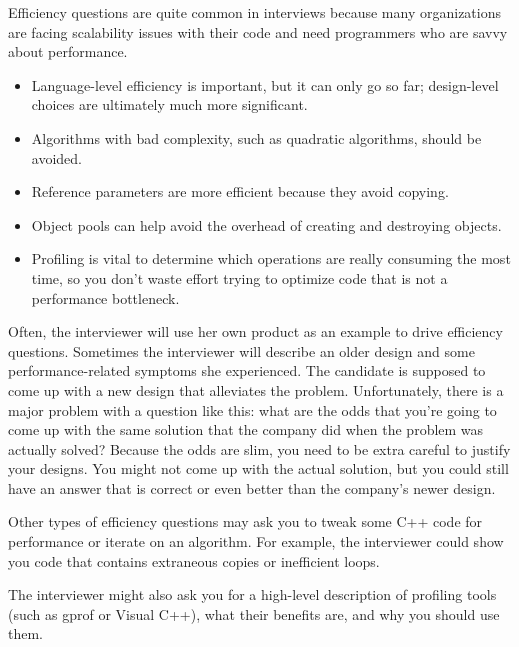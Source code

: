 
Efficiency questions are quite common in interviews because many organizations are facing scalability issues with their code and need programmers who are savvy about performance.


\begin{itemize}
\item
Language-level efficiency is important, but it can only go so far; design-level choices are ultimately much more significant.

\item
Algorithms with bad complexity, such as quadratic algorithms, should be avoided.

\item
Reference parameters are more efficient because they avoid copying.

\item
Object pools can help avoid the overhead of creating and destroying objects.

\item
Profiling is vital to determine which operations are really consuming the most time, so you don’t waste effort trying to optimize code that is not a performance bottleneck.
\end{itemize}


Often, the interviewer will use her own product as an example to drive efficiency questions. Sometimes the interviewer will describe an older design and some performance-related symptoms she experienced. The candidate is supposed to come up with a new design that alleviates the problem. Unfortunately, there is a major problem with a question like this: what are the odds that you’re going to come up with the same solution that the company did when the problem was actually solved? Because the odds are slim, you need to be extra careful to justify your designs. You might not come up with the actual solution, but you could still have an answer that is correct or even better than the company’s newer design.

Other types of efficiency questions may ask you to tweak some C++ code for performance or iterate on an algorithm. For example, the interviewer could show you code that contains extraneous copies or inefficient loops.

The interviewer might also ask you for a high-level description of profiling tools (such as gprof or Visual C++), what their benefits are, and why you should use them.







